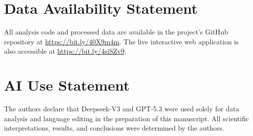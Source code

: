 \documentclass[conference]{IEEEtran}
\begin{document}
\section*{Data Availability Statement}

All analysis code and processed data are available in the project's GitHub repository at \url{https://bit.ly/40X9m4m}. The live interactive web application is also accessible at \url{https://bit.ly/4siSZv9}.



\section*{AI Use Statement}

The authors declare that Deepseek-V3 and GPT-5.3 were used solely for data analysis and language editing in the preparation of this manuscript. All scientific interpretations, results, and conclusions were determined by the authors.


\end{document}
